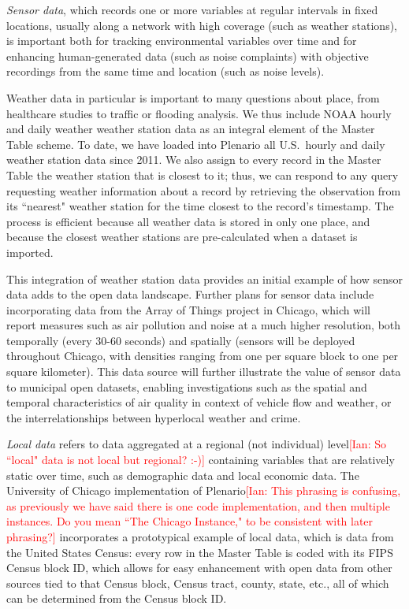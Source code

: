 \documentclass[11pt]{article}
\newcommand{\ian}[1]{\textcolor{Red}{[Ian: #1]}}
\newcommand{\ian}[1]{}
\begin{document}
\textit{Sensor data}, which records one or more variables at regular intervals in fixed locations, usually along a network with high coverage (such as weather stations), is important both for tracking environmental variables over time and for enhancing human-generated data (such as noise complaints) with objective recordings from the same time and location (such as noise levels). 

Weather data in particular is important to many questions about place, from healthcare studies to traffic or flooding analysis. We thus include NOAA hourly and daily weather weather station data as an integral element of the Master Table scheme. To date, we have loaded into Plenario all U.S.\ hourly and daily weather station data since 2011.
We also assign to every record in the Master Table the weather station that is closest to it; thus, we can respond to any query requesting weather information about a record by retrieving the observation from its ``nearest" weather station for the time closest to the record's timestamp. The process is efficient because all weather data is stored in only one place, and because the closest weather stations are pre-calculated when a dataset is imported. 

This integration of weather station data provides an initial example of how sensor data adds to the open data landscape.
Further plans for sensor data include incorporating data from the Array of Things \cite{moser_2015} project in Chicago, which will report measures such as air pollution and noise at a much higher resolution, both temporally (every 30-60 seconds) and spatially (sensors will be deployed throughout Chicago, with densities ranging from one per square block to one per square kilometer). This data source will further illustrate the value of sensor data to municipal open datasets, enabling investigations such as the spatial and temporal characteristics of air quality in context of vehicle flow and weather, or the interrelationships between hyperlocal weather and crime. 

\textit{Local data} refers to data aggregated at a regional (not individual) level\ian{So ``local" data is not local but regional? :-)} containing variables that are relatively static over time, such as demographic data and local economic data. The University of Chicago implementation of Plenario\ian{This phrasing is confusing, as previously we have said there is one code implementation, and then multiple instances. Do you mean ``The Chicago Instance," to be consistent with later phrasing?} incorporates a prototypical example of local data, which is data from the United States Census: every row in the Master Table is coded with its FIPS Census block ID, which allows for easy enhancement with open data from other sources tied to that Census block, Census tract, county, state, etc., all of which can be determined from the Census block ID. 
\end{document}
